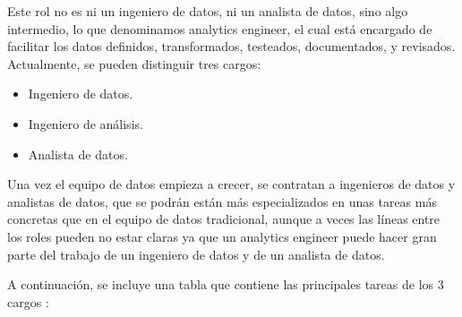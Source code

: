 Este rol no es ni un ingeniero de datos, ni un analista de datos, sino algo intermedio, lo que denominamos analytics engineer, el cual está encargado de facilitar los datos definidos, transformados, testeados, documentados, y revisados.
\newpage
Actualmente, se pueden distinguir tres cargos:

\begin{itemize}
	\item Ingeniero de datos.
	\item Ingeniero de análisis.
	\item Analista de datos.
\end{itemize}

Una vez el equipo de datos empieza a crecer, se contratan a ingenieros de datos y analistas de datos, que se podrán están más especializados en unas tareas más concretas que en el equipo de datos tradicional, aunque a veces las líneas entre los roles pueden no estar claras ya que un analytics engineer puede hacer gran parte del trabajo de un ingeniero de datos y de un analista de datos.

A continuación, se incluye una tabla que contiene las principales tareas de los 3 cargos :

